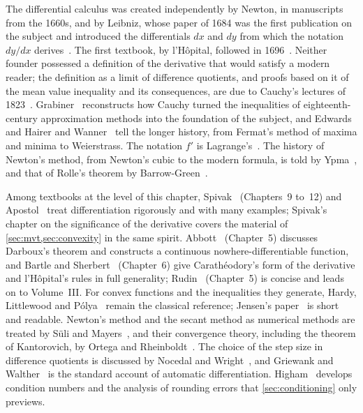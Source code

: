 \chapternotes

The differential calculus was created independently by Newton, in manuscripts from the 1660s, and by Leibniz, whose paper of 1684 was the first publication on the subject and introduced the differentials $dx$ and $dy$ from which the notation $dy/dx$ derives~\cite{leibniz1684}. The first textbook, by l'H\^opital, followed in 1696~\cite{lhopital1696}. Neither founder possessed a definition of the derivative that would satisfy a modern reader; the definition as a limit of difference quotients, and proofs based on it of the mean value inequality and its consequences, are due to Cauchy's lectures of 1823~\cite{cauchy1823}. Grabiner~\cite{grabiner1981} reconstructs how Cauchy turned the inequalities of eighteenth-century approximation methods into the foundation of the subject, and Edwards~\cite{edwards1979} and Hairer and Wanner~\cite{hairer1996analysis} tell the longer history, from Fermat's method of maxima and minima to Weierstrass. The notation $f'$ is Lagrange's~\cite{lagrange1797}. The history of Newton's method, from Newton's cubic to the modern formula, is told by Ypma~\cite{ypma1995}, and that of Rolle's theorem by Barrow-Green~\cite{barrowgreen2009}.

Among textbooks at the level of this chapter, Spivak~\cite{spivak2008calculus} (Chapters~9 to~12) and Apostol~\cite{apostol1967calculus} treat differentiation rigorously and with many examples; Spivak's chapter on the significance of the derivative covers the material of \cref{sec:mvt,sec:convexity} in the same spirit. Abbott~\cite{abbott2015} (Chapter~5) discusses Darboux's theorem and constructs a continuous nowhere-differentiable function, and Bartle and Sherbert~\cite{bartle2011} (Chapter~6) give Carath\'eodory's form of the derivative and l'H\^opital's rules in full generality; Rudin~\cite{rudin1976} (Chapter~5) is concise and leads on to Volume~III. For convex functions and the inequalities they generate, Hardy, Littlewood and P\'olya~\cite{hardy1952inequalities} remain the classical reference; Jensen's paper~\cite{jensen1906} is short and readable. Newton's method and the secant method as numerical methods are treated by S\"uli and Mayers~\cite{suli2003}, and their convergence theory, including the theorem of Kantorovich, by Ortega and Rheinboldt~\cite{ortega2000}. The choice of the step size in difference quotients is discussed by Nocedal and Wright~\cite{nocedal2006}, and Griewank and Walther~\cite{griewank2008} is the standard account of automatic differentiation. Higham~\cite{higham2002accuracy} develops condition numbers and the analysis of rounding errors that \cref{sec:conditioning} only previews.

\chapterreferences

